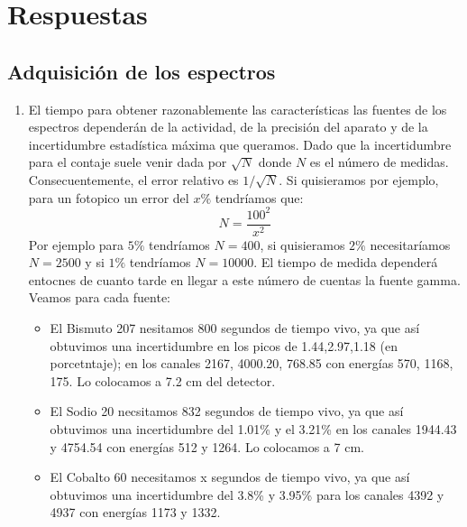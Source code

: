\documentclass[11pt]{article}
\begin{document}

\newpage

\section{Respuestas}


\subsection{Adquisición de los espectros}
\begin{enumerate}[label=\alph*)]
    \item El tiempo para obtener razonablemente las características las fuentes de los espectros dependerán de la actividad, de la precisión del aparato y de la incertidumbre estadística máxima que queramos. Dado que la incertidumbre para el contaje suele venir dada por $\sqrt{N}$ donde $N$ es el número de medidas. Consecuentemente, el error relativo es $1/\sqrt{N}$. Si quisieramos por ejemplo, para un fotopico un error del $x\%$ tendríamos que:
    \begin{equation}
        N = \frac{100^2}{x^2}
    \end{equation}
    Por ejemplo para $5\%$ tendríamos $N=400$, si quisieramos $2\%$ necesitaríamos $N=2500$ y si $1\%$ tendríamos $N=10000$. El tiempo de medida dependerá entocnes de cuanto tarde en llegar a este número de cuentas la fuente gamma. Veamos para cada fuente:

    \begin{itemize}
        \item El Bismuto 207 nesitamos 800 segundos de tiempo vivo, ya que así obtuvimos una incertidumbre en los picos de 1.44,2.97,1.18 (en porcetntaje); en los canales 2167, 4000.20, 768.85 con energías 570, 1168, 175. Lo colocamos a 7.2 cm del detector. 
        \item El Sodio 20  necsitamos 832 segundos de tiempo vivo, ya que así obtuvimos una incertidumbre del 1.01\% y el 3.21\% en los canales 1944.43 y 4754.54 con energías 512 y 1264. Lo colocamos a 7 cm.
        \item El Cobalto 60 necesitamos x segundos de tiempo vivo, ya que así obtuvimos una incertidumbre del 3.8\% y 3.95\% para los canales 4392 y 4937 con energías 1173 y 1332. 
    \end{itemize}





\end{enumerate}
\end{document}
